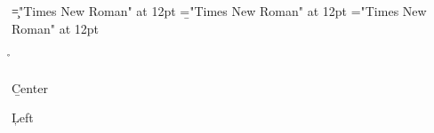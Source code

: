 \font\c="Times New Roman" at 12pt
\font\b="Times New Roman" at 12pt
\font\a="Times New Roman" at 12pt
 \r\n
{}

\centerline{\b{Center}
}
\c{Left}


\bye
